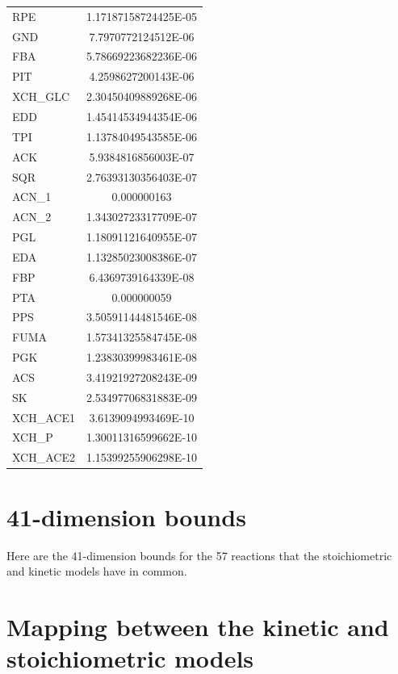 \documentclass[parskip=full, numbers=noenddot]{scrreprt}
\begin{document}
\begin{longtable}{lS}
RPE & 1.17187158724425E-05\\
GND & 7.7970772124512E-06\\
FBA & 5.78669223682236E-06\\
PIT & 4.2598627200143E-06\\
XCH\_GLC & 2.30450409889268E-06\\
EDD & 1.45414534944354E-06\\
TPI & 1.13784049543585E-06\\
ACK & 5.9384816856003E-07\\
SQR & 2.76393130356403E-07\\
ACN\_1 & 0.000000163\\
ACN\_2 & 1.34302723317709E-07\\
PGL & 1.18091121640955E-07\\
EDA & 1.13285023008386E-07\\
FBP & 6.4369739164339E-08\\
PTA & 0.000000059\\
PPS & 3.50591144481546E-08\\
FUMA & 1.57341325584745E-08\\
PGK & 1.23830399983461E-08\\
ACS & 3.41921927208243E-09\\
SK & 2.53497706831883E-09\\
XCH\_ACE1 & 3.6139094993469E-10\\
XCH\_P & 1.30011316599662E-10\\
XCH\_ACE2 & 1.15399255906298E-10\\
\bottomrule
\end{longtable}

\section{41-dimension bounds}
\label{ap:41dbounds}

Here are the 41-dimension bounds for the 57 reactions that the stoichiometric and kinetic models have in common.


\section{Mapping between the kinetic and stoichiometric models}
\label{ap:mapping}
\end{document}
